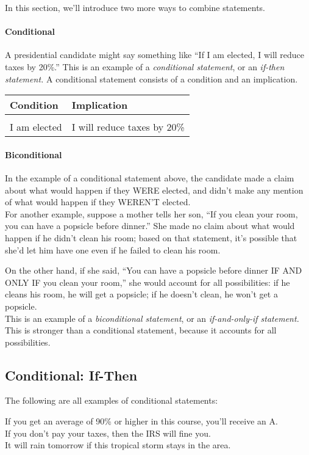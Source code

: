 \setcounter{ExampleCounter}{1}
In this section, we'll introduce two more ways to combine statements.

\paragraph{Conditional} A presidential candidate might say something like ``If I am elected, I will reduce taxes by 20\%.''  This is an example of a \textit{conditional statement}, or an \textit{if-then statement.}  A conditional statement consists of a condition and an implication.
\begin{center}
\begin{tabular}{l l}
Condition & Implication\\
\hline
& \\
I am elected & I will reduce taxes by 20\%
\end{tabular}
\end{center}

\paragraph{Biconditional} In the example of a conditional statement above, the candidate made a claim about what would happen if they WERE elected, and didn't make any mention of what would happen if they WEREN'T elected.\\

For another example, suppose a mother tells her son, ``If you clean your room, you can have a popsicle before dinner.''  She made no claim about what would happen if he didn't clean his room; based on that statement, it's possible that she'd let him have one even if he failed to clean his room.

On the other hand, if she said, ``You can have a popsicle before dinner IF AND ONLY IF you clean your room,'' she would account for all possibilities: if he cleans his room, he will get a popsicle; if he doesn't clean, he won't get a popsicle.\\

This is an example of a \textit{biconditional statement}, or an \textit{if-and-only-if statement.}  This is stronger than a conditional statement, because it accounts for all possibilities.

\subsection{Conditional: If-Then}
The following are all examples of conditional statements:
\begin{center}
If you get an average of 90\% or higher in this course, you'll receive an A.\\
If you don't pay your taxes, then the IRS will fine you.\\
It will rain tomorrow if this tropical storm stays in the area.
\end{center}

